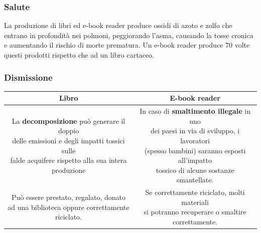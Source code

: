 \subsubsection{Salute}
La produzione di libri ed e-book reader produce ossidi di azoto e zolfo che entrano in profondità nei polmoni, peggiorando l'asma, causando la tosse cronica e aumentando il rischio di morte prematura. Un e-book reader produce $70$ volte questi prodotti rispetto che ad un libro cartaceo.

\subsubsection{Dismissione}
\begin{table}[h]
	\begin{tabular}{|c|c|}
		\hline
		Libro & E-book reader \\
		\hline
		\multirowcell{2}{La \textbf{decomposizione} può generare il doppio \\delle emissioni e degli impatti tossici sulle \\ falde acquifere rispetto alla sua intera produzione} & \multirowcell{2}{In caso di \textbf{smaltimento illegale} in uno \\ dei paesi in via di sviluppo, i lavoratori\\ (spesso bambini) saranno esposti all'impatto\\ tossico di alcune sostanze smantellate. }\\
		\hline
		\multirowcell{2}{Può essere prestato, regalato, donato \\ad una biblioteca oppure correttamente riciclato. }& \multirowcell{2}{Se correttamente riciclato, molti materiali \\si potranno recuperare o smaltire correttamente.}\\
		\hline
	\end{tabular}
\end{table}

